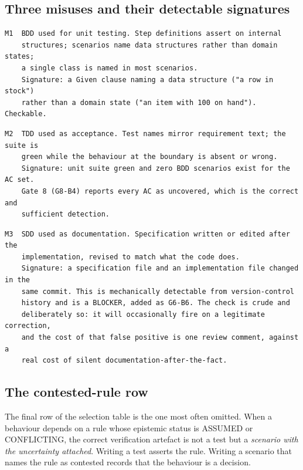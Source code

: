 \documentclass[11pt,a4paper]{article}
\begin{document}
\subsection{Three misuses and their detectable signatures}

\begin{Verbatim}[fontsize=\footnotesize,breaklines=true,breakanywhere=true,breakautoindent=false,samepage=false]
M1  BDD used for unit testing. Step definitions assert on internal
    structures; scenarios name data structures rather than domain states;
    a single class is named in most scenarios.
    Signature: a Given clause naming a data structure ("a row in stock")
    rather than a domain state ("an item with 100 on hand"). Checkable.
\end{Verbatim}

\begin{Verbatim}[fontsize=\footnotesize,breaklines=true,breakanywhere=true,breakautoindent=false,samepage=false]
M2  TDD used as acceptance. Test names mirror requirement text; the suite is
    green while the behaviour at the boundary is absent or wrong.
    Signature: unit suite green and zero BDD scenarios exist for the AC set.
    Gate 8 (G8-B4) reports every AC as uncovered, which is the correct and
    sufficient detection.
\end{Verbatim}

\begin{Verbatim}[fontsize=\footnotesize,breaklines=true,breakanywhere=true,breakautoindent=false,samepage=false]
M3  SDD used as documentation. Specification written or edited after the
    implementation, revised to match what the code does.
    Signature: a specification file and an implementation file changed in the
    same commit. This is mechanically detectable from version-control
    history and is a BLOCKER, added as G6-B6. The check is crude and
    deliberately so: it will occasionally fire on a legitimate correction,
    and the cost of that false positive is one review comment, against a
    real cost of silent documentation-after-the-fact.
\end{Verbatim}

\subsection{The contested-rule row}

The final row of the selection table is the one most often omitted. When a behaviour depends on a rule whose epistemic status is ASSUMED or CONFLICTING, the correct verification artefact is not a test but a \emph{scenario with the uncertainty attached}. Writing a test asserts the rule. Writing a scenario that names the rule as contested records that the behaviour is a decision.
\end{document}
